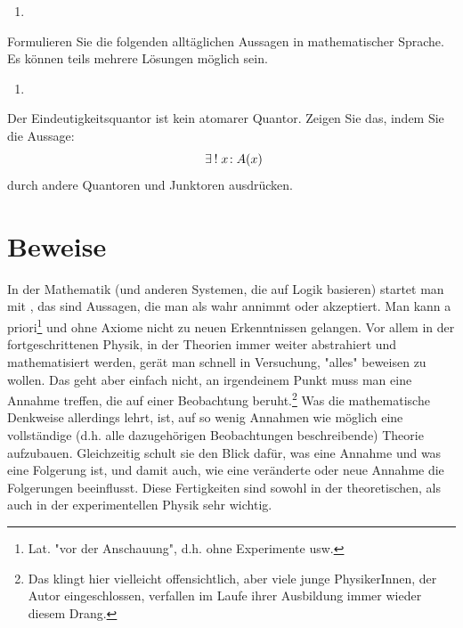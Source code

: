 \begin{example}
    \begin{enumerate}
        \item 
    \end{enumerate}
\end{example}

\begin{exercise}
    Formulieren Sie die folgenden alltäglichen Aussagen in mathematischer Sprache. Es können teils mehrere Lösungen möglich sein.
    \begin{enumerate}
        \item 
    \end{enumerate}
\end{exercise}

\begin{exercise}
    Der Eindeutigkeitsquantor ist kein atomarer Quantor. Zeigen Sie das, indem Sie die Aussage:
    $$\existsone x\!: A(x)$$
    durch andere Quantoren und Junktoren ausdrücken.
\end{exercise}



\section{Beweise}

In der Mathematik (und anderen Systemen, die auf Logik basieren) startet man mit , das sind Aussagen, die man als wahr annimmt oder akzeptiert. Man kann a priori\footnote{Lat. "vor der Anschauung", d.h. ohne Experimente usw.} und ohne Axiome nicht zu neuen Erkenntnissen gelangen. Vor allem in der fortgeschrittenen Physik, in der Theorien immer weiter abstrahiert und mathematisiert werden, gerät man schnell in Versuchung, "alles" beweisen zu wollen. Das geht aber einfach nicht, an irgendeinem Punkt muss man eine Annahme treffen, die auf einer Beobachtung beruht.\footnote{Das klingt hier vielleicht offensichtlich, aber viele junge PhysikerInnen, der Autor eingeschlossen, verfallen im Laufe ihrer Ausbildung immer wieder diesem Drang.} Was die mathematische Denkweise allerdings lehrt, ist, auf so wenig Annahmen wie möglich eine vollständige (d.h. alle dazugehörigen Beobachtungen beschreibende) Theorie aufzubauen. Gleichzeitig schult sie den Blick dafür, was eine Annahme und was eine Folgerung ist, und damit auch, wie eine veränderte oder neue Annahme die Folgerungen beeinflusst. Diese Fertigkeiten sind sowohl in der theoretischen, als auch in der experimentellen Physik sehr wichtig.


